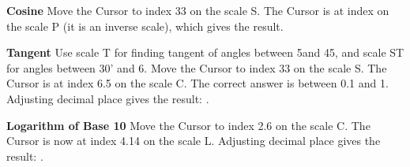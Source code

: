 \begin{multicols*}{3}
{  \textbf{Cosine}
Move the Cursor to index 33 on the scale S.
The Cursor is at index  on the scale P (it is an inverse scale), which gives the result.

  \textbf{Tangent}
\footnotesize Use scale T for finding tangent of angles between 5\textdegree and 45\textdegree, and scale ST for angles between 30' and 6\textdegree. \normalsize
{}
Move the Cursor to index 33 on the scale S.
The Cursor is at index 6.5 on the scale C.
The correct answer is between 0.1 and 1. Adjusting decimal place gives the result: .

  \textbf{Logarithm of Base 10} 
Move the Cursor to index 2.6 on the scale C.
The Cursor is now at index 4.14 on the scale L.
Adjusting decimal place gives the result: .
  }
  \end{multicols*}
  

